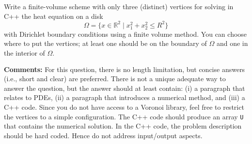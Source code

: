 \question{}

Write a finite-volume scheme with only three (distinct) vertices for solving in C++ the heat equation on a disk
\[
\Omega = \{x\in\mathbb{R}^2 \mid x_1^2+x_2^2 \leq R^2\}
\]
with Dirichlet boundary conditions using a finite volume method. You can choose where to put the vertices; at least one should be on the boundary of $\Omega$ and one in the interior of $\Omega$.

{\bf Comments:} For this question, there is no length limitation, but concise answers (i.e., short and clear) are preferred. There is not a unique adequate way to answer the question, but the answer should at least contain: (i) a paragraph that relates to PDEs, (ii) a paragraph that introduces a numerical method, and (iii) a C++ code. Since you do not have access to a Voronoi library, feel free to restrict the vertices to a simple configuration. The C++ code should produce an array \texttt{U} that contains the numerical solution. In the C++ code, the problem description should be hard coded. Hence do not address input/output aspects.
